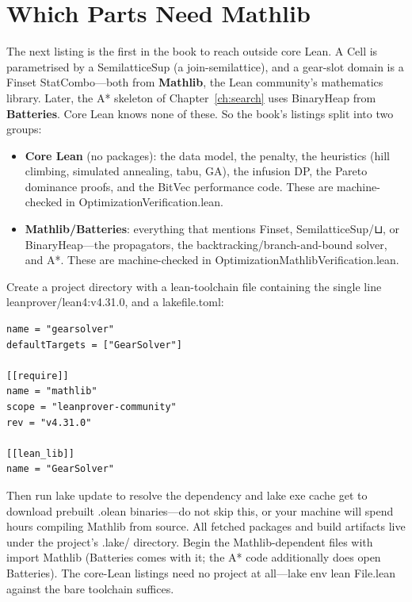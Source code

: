 \documentclass[11pt, a4paper, oneside]{book}
\newcommand{\li}[1]{{\ttfamily\small\color{deepblue}#1}}
\begin{document}
\section{Which Parts Need Mathlib}\label{sec:mathlib-setup}

The next listing is the first in the book to reach outside core Lean.  A
\li{Cell} is parametrised by a \li{SemilatticeSup} (a join-semilattice), and a
gear-slot domain is a \li{Finset StatCombo}---both from \textbf{Mathlib}, the
Lean community's mathematics library.  Later, the A* skeleton of
Chapter~\ref{ch:search} uses \li{BinaryHeap} from \textbf{Batteries}.  Core Lean
knows none of these.  So the book's listings split into two groups:

\begin{itemize}[nosep]
  \item \textbf{Core Lean} (no packages): the data model, the penalty, the
    heuristics (hill climbing, simulated annealing, tabu, GA), the infusion DP,
    the Pareto dominance proofs, and the \li{BitVec} performance code.  These are
    machine-checked in \li{OptimizationVerification.lean}.
  \item \textbf{Mathlib/Batteries}: everything that mentions \li{Finset},
    \li{SemilatticeSup}/\li{⊔}, or \li{BinaryHeap}---the propagators, the
    backtracking/branch-and-bound solver, and A*.  These are machine-checked in
    \li{OptimizationMathlibVerification.lean}.
\end{itemize}

\begin{intuitionbox}[title={Setting up a Mathlib project}]
Create a project directory with a \li{lean-toolchain} file containing the single
line \li{leanprover/lean4:v4.31.0}, and a \li{lakefile.toml}:

\begin{verbatim}
name = "gearsolver"
defaultTargets = ["GearSolver"]

[[require]]
name = "mathlib"
scope = "leanprover-community"
rev = "v4.31.0"

[[lean_lib]]
name = "GearSolver"
\end{verbatim}

Then run \li{lake update} to resolve the dependency and \li{lake exe cache get}
to download prebuilt \li{.olean} binaries---do not skip this, or your machine
will spend hours compiling Mathlib from source.  All fetched packages and build
artifacts live under the project's \li{.lake/} directory.  Begin the
Mathlib-dependent files with \li{import Mathlib} (Batteries comes with it; the
A* code additionally does \li{open Batteries}).  The core-Lean listings need no
project at all---\li{lake env lean File.lean} against the bare toolchain
suffices.
\end{intuitionbox}
\end{document}
